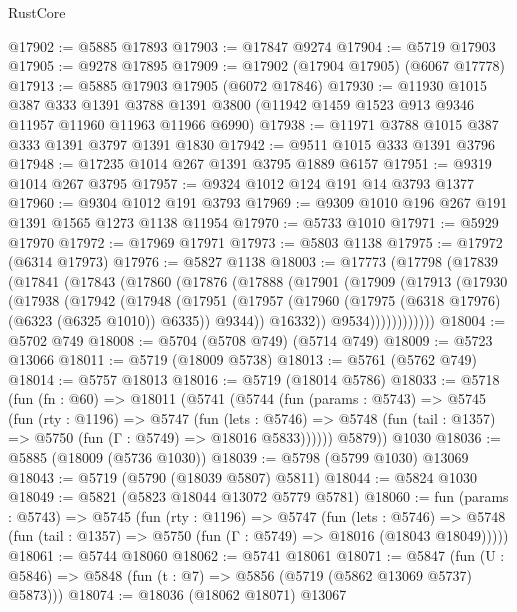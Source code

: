 \begin{lexlean}{RustCore}
\begin{coremodule}
@17902 := @5885 @17893
@17903 := @17847 @9274
@17904 := @5719 @17903
@17905 := @9278 @17895
@17909 := @17902 (@17904 @17905) (@6067 @17778)
@17913 := @5885 @17903 @17905 (@6072 @17846)
@17930 := @11930
    @1015
    @387
    @333
    @1391
    @3788
    @1391
    @3800
    (@11942 @1459 @1523 @913 @9346 @11957 @11960 @11963 @11966 @6990)
@17938 := @11971 @3788 @1015 @387 @333 @1391 @3797 @1391 @1830
@17942 := @9511 @1015 @333 @1391 @3796
@17948 := @17235 @1014 @267 @1391 @3795 @1889 @6157
@17951 := @9319 @1014 @267 @3795
@17957 := @9324 @1012 @124 @191 @14 @3793 @1377
@17960 := @9304 @1012 @191 @3793
@17969 := @9309 @1010 @196 @267 @191 @1391 @1565 @1273 @1138 @11954
@17970 := @5733 @1010
@17971 := @5929 @17970
@17972 := @17969 @17971
@17973 := @5803 @1138
@17975 := @17972 (@6314 @17973)
@17976 := @5827 @1138
@18003 := @17773
    (@17798
      (@17839
        (@17841
          (@17843
            (@17860
              (@17876
                (@17888
                  (@17901
                    (@17909
                      (@17913
                        (@17930
                          (@17938
                            (@17942
                              (@17948
                                (@17951
                                  (@17957
                                    (@17960 (@17975 (@6318 @17976) (@6323 (@6325 @1010)) @6335))
                                    @9344))
                                @16332))
                            @9534))))))))))))
@18004 := @5702 @749
@18008 := @5704 (@5708 @749) (@5714 @749)
@18009 := @5723 @13066
@18011 := @5719 (@18009 @5738)
@18013 := @5761 (@5762 @749)
@18014 := @5757 @18013
@18016 := @5719 (@18014 @5786)
@18033 := @5718
    (fun (fn : @60) =>
    @18011
      (@5741
        (@5744
          (fun (params : @5743) =>
          @5745
            (fun (rty : @1196) =>
            @5747
              (fun (lets : @5746) =>
              @5748 (fun (tail : @1357) => @5750 (fun (Γ : @5749) => @18016 @5833))))))
        @5879))
    @1030
@18036 := @5885 (@18009 (@5736 @1030))
@18039 := @5798 (@5799 @1030) @13069
@18043 := @5719 (@5790 (@18039 @5807) @5811)
@18044 := @5824 @1030
@18049 := @5821 (@5823 @18044 @13072 @5779 @5781)
@18060 := fun (params : @5743) =>
  @5745
    (fun (rty : @1196) =>
    @5747
      (fun (lets : @5746) =>
      @5748 (fun (tail : @1357) => @5750 (fun (Γ : @5749) => @18016 (@18043 @18049)))))
@18061 := @5744 @18060
@18062 := @5741 @18061
@18071 := @5847
    (fun (U : @5846) => @5848 (fun (t : @7) => @5856 (@5719 (@5862 @13069 @5737) @5873)))
@18074 := @18036 (@18062 @18071) @13067

\end{coremodule}
\end{lexlean}
